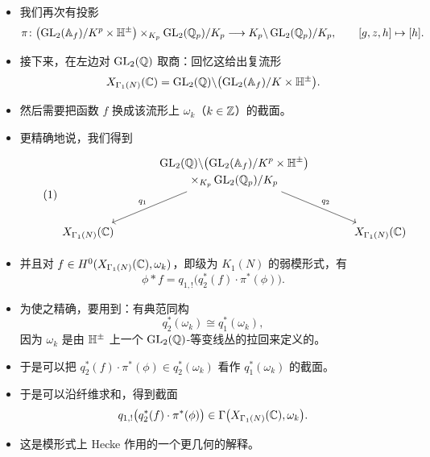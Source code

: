 \begin{itemize}
\item 我们再次有投影
\[
\pi\colon\bigl(\operatorname{GL}_2(\mathbb{A}_f)/K^p\times\mathbb{H}^\pm\bigr)\times_{K_p}\operatorname{GL}_2(\mathbb{Q}_p)/K_p\longrightarrow K_p\backslash\operatorname{GL}_2(\mathbb{Q}_p)/K_p,\qquad [g,z,h]\mapsto[h].
\]
\item 接下来，在左边对 $\operatorname{GL}_2(\mathbb{Q})$ 取商：回忆这给出复流形
\[
X_{\Gamma_1(N)}(\mathbb{C})=\operatorname{GL}_2(\mathbb{Q})\backslash\bigl(\operatorname{GL}_2(\mathbb{A}_f)/K\times\mathbb{H}^\pm\bigr).
\]
\item 然后需要把函数 $f$ 换成该流形上 $\omega_k$（$k\in\mathbb{Z}$）的截面。
\item 更精确地说，我们得到
\begin{equation}\tag{1}\label{eq:8.1}
\begin{tikzcd}[column sep=3.2em, row sep=2.8em]
& \begin{gathered}\GL_2(\Q)\backslash\bigl(\GL_2(\Af)/K^p\times\HH^{\pm}\bigr)\\\times_{K_p}\GL_2(\Q_p)/K_p\end{gathered}\arrow[dl,"q_1"']\arrow[dr,"q_2"] &\\
X_{\Gamma_1(N)}(\C) & & X_{\Gamma_1(N)}(\C)
\end{tikzcd}
\end{equation}
\item 并且对 $f\in H^0(X_{\Gamma_1(N)}(\mathbb{C}),\omega_k)$，即级为 $K_1(N)$ 的弱模形式，有
\[
\phi*f=q_{1,!}\bigl(q_2^*(f)\cdot\pi^*(\phi)\bigr).
\]
\item 为使之精确，要用到：有典范同构
\[
q_2^*(\omega_k)\cong q_1^*(\omega_k),
\]
因为 $\omega_k$ 是由 $\mathbb{H}^\pm$ 上一个 $\operatorname{GL}_2(\mathbb{Q})$-等变线丛的拉回来定义的。
\item 于是可以把 $q_2^*(f)\cdot\pi^*(\phi)\in q_2^*(\omega_k)$ 看作 $q_1^*(\omega_k)$ 的截面。
\item 于是可以沿纤维求和，得到截面
\[
q_{1,!}\bigl(q_2^*(f)\cdot\pi^*(\phi)\bigr)\in\Gamma\bigl(X_{\Gamma_1(N)}(\mathbb{C}),\omega_k\bigr).
\]
\item 这是模形式上 Hecke 作用的一个更几何的解释。
\end{itemize}

